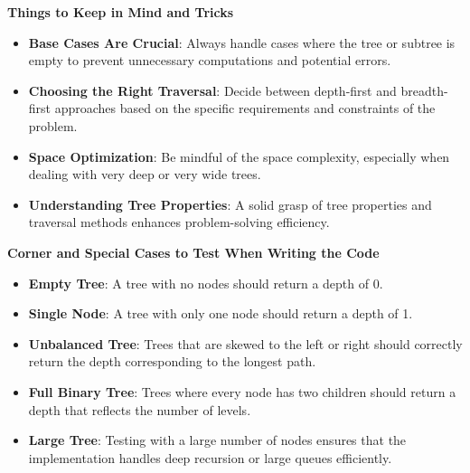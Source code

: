 \textbf{Things to Keep in Mind and Tricks}

\begin{itemize}
    \item \textbf{Base Cases Are Crucial}: Always handle cases where the tree or subtree is empty to prevent unnecessary computations and potential errors.
    \item \textbf{Choosing the Right Traversal}: Decide between depth-first and breadth-first approaches based on the specific requirements and constraints of the problem.
    \item \textbf{Space Optimization}: Be mindful of the space complexity, especially when dealing with very deep or very wide trees.
    \item \textbf{Understanding Tree Properties}: A solid grasp of tree properties and traversal methods enhances problem-solving efficiency.
\end{itemize}

\textbf{Corner and Special Cases to Test When Writing the Code}

\begin{itemize}
    \item \textbf{Empty Tree}: A tree with no nodes should return a depth of 0.
    \item \textbf{Single Node}: A tree with only one node should return a depth of 1.
    \item \textbf{Unbalanced Tree}: Trees that are skewed to the left or right should correctly return the depth corresponding to the longest path.
    \item \textbf{Full Binary Tree}: Trees where every node has two children should return a depth that reflects the number of levels.
    \item \textbf{Large Tree}: Testing with a large number of nodes ensures that the implementation handles deep recursion or large queues efficiently.
\end{itemize}